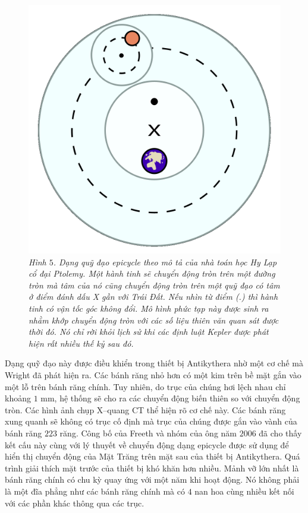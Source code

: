 \begin{multicols}{2}
	\begin{figure}[H]
		\vspace*{-5pt}
		\centering
		\captionsetup{labelformat= empty, justification=centering}
		\includegraphics[width= 0.8\linewidth]{6}
		\caption{\small\textit{\color{lichsutoanhoc}Hình $5$. Dạng quỹ đạo epicycle theo mô tả của nhà toán học Hy Lạp cổ đại Ptolemy. Một hành tinh sẽ chuyển động tròn trên một đường tròn mà tâm của nó cũng chuyển động tròn trên một quỹ đạo có tâm ở điểm đánh dấu X gần với Trái Đất. Nếu nhìn từ điểm (.) thì hành tinh có vận tốc góc không đổi. Mô hình phức tạp này được sinh ra nhằm khớp chuyển động tròn với các số liệu thiên văn quan sát được thời đó. Nó chỉ rời khỏi lịch sử khi các định luật Kepler được phát hiện rất nhiều thế kỷ sau đó.}}
		\vspace*{-10pt}
	\end{figure}
	Dạng quỹ đạo này được điều khiển trong thiết bị Antikythera nhờ một cơ chế mà Wright đã phát hiện ra. Các bánh răng nhỏ hơn có một kim trên bề mặt gắn vào một lỗ trên bánh răng chính. Tuy nhiên, do trục của chúng hơi lệch nhau chỉ khoảng $1$ mm, hệ thống sẽ cho ra các chuyển động biến thiên so với chuyển động tròn. Các hình ảnh chụp X--quang CT thể hiện rõ cơ chế này. Các bánh răng xung quanh sẽ không có trục cố định mà trục của chúng được gắn vào vành của bánh răng $223$ răng. Công bố của Freeth và nhóm của ông năm $2006$ đã cho thấy kết cấu này cùng với lý thuyết về chuyển động dạng epicycle được sử dụng để hiển thị chuyển động của Mặt Trăng trên mặt sau của thiết bị Antikythera.
	\vskip 0.1cm
	Quá trình giải thích mặt trước của thiết bị khó khăn hơn nhiều. Mảnh vỡ lớn nhất là bánh răng chính có chu kỳ quay ứng với một năm khi hoạt động. Nó không phải là một đĩa phẳng như các bánh răng chính mà có $4$ nan hoa cùng nhiều kết nối với các phần khác thông qua các trục.

\end{multicols}
